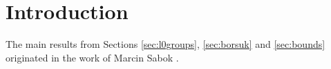 \section{Introduction}

The main results from Sections \ref{sec:l0groups}, \ref{sec:borsuk} and \ref{sec:bounds} originated in the work of Marcin Sabok \cite{sabok2012}. 
